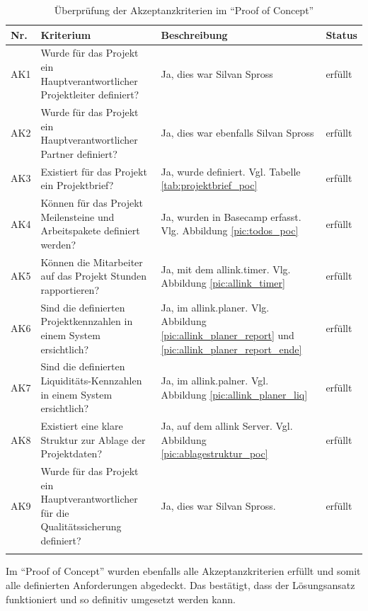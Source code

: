 \begin{longtable}{lp{6cm}p{5cm}l}
    \toprule \textbf{Nr.} & \textbf{Kriterium} & \textbf{Beschreibung} & \textbf{Status} \\
    \midrule AK1 &
        Wurde für das Projekt ein Hauptverantwortlicher Projektleiter definiert? &
        Ja, dies war Silvan Spross &
        erfüllt \\
    \midrule AK2 &
        Wurde für das Projekt ein Hauptverantwortlicher Partner definiert? &
        Ja, dies war ebenfalls Silvan Spross &
        erfüllt \\
    \midrule AK3 &
        Existiert für das Projekt ein Projektbrief? &
        Ja, wurde definiert. Vgl. Tabelle \ref{tab:projektbrief_poc} &
        erfüllt \\
    \midrule AK4 &
        Können für das Projekt Meilensteine und Arbeitspakete definiert werden? &
        Ja, wurden in Basecamp erfasst. Vlg. Abbildung \ref{pic:todos_poc} &
        erfüllt \\
    \midrule AK5 &
        Können die Mitarbeiter auf das Projekt Stunden rapportieren? &
        Ja, mit dem allink.timer. Vlg. Abbildung \ref{pic:allink_timer} &
        erfüllt \\
    \midrule AK6 &
        Sind die definierten Projektkennzahlen in einem System ersichtlich? &
        Ja, im allink.planer. Vlg. Abbildung \ref{pic:allink_planer_report}
        und \ref{pic:allink_planer_report_ende} &
        erfüllt \\
    \midrule AK7 &
        Sind die definierten Liquiditäts-Kennzahlen in einem System ersichtlich? &
        Ja, im allink.palner. Vgl. Abbildung \ref{pic:allink_planer_liq} &
        erfüllt \\
    \midrule AK8 &
        Existiert eine klare Struktur zur Ablage der Projektdaten? &
        Ja, auf dem allink Server. Vgl. Abbildung \ref{pic:ablagestruktur_poc} &
        erfüllt \\
    \midrule AK9 &
        Wurde für das Projekt ein Hauptverantwortlicher für die Qualitätssicherung definiert? &
        Ja, dies war Silvan Spross. &
        erfüllt \\
    \bottomrule
    \caption[Überprüfung der Akzeptanzkriterien im ``Proof of Concept'']{Überprüfung 
        der Akzeptanzkriterien im ``Proof of Concept''\footnotemark}
    \label{tab:akzeptanzkriterien_test_poc}
\end{longtable}

Im ``Proof of Concept'' wurden ebenfalls alle Akzeptanzkriterien erfüllt
und somit alle definierten Anforderungen abgedeckt. Das bestätigt, dass der
Lösungsansatz funktioniert und so definitiv umgesetzt werden kann.
